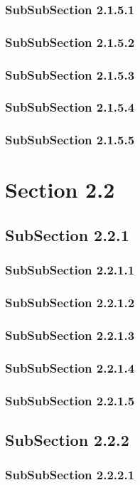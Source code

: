 \subsubsection{SubSubSection 2.1.5.1}
\subsubsection{SubSubSection 2.1.5.2}
\subsubsection{SubSubSection 2.1.5.3}
\subsubsection{SubSubSection 2.1.5.4}
\subsubsection{SubSubSection 2.1.5.5}
\section{Section 2.2}
\subsection{SubSection 2.2.1}
\subsubsection{SubSubSection 2.2.1.1}
\subsubsection{SubSubSection 2.2.1.2}
\subsubsection{SubSubSection 2.2.1.3}
\subsubsection{SubSubSection 2.2.1.4}
\subsubsection{SubSubSection 2.2.1.5}
\subsection{SubSection 2.2.2}
\subsubsection{SubSubSection 2.2.2.1}
